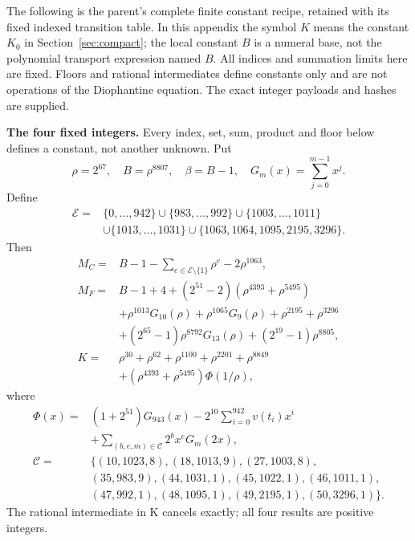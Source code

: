 The following is the parent's complete finite constant recipe, retained
with its fixed indexed transition table. In this appendix the symbol $K$
means the constant $K_0$ in Section~\ref{sec:compact}; the local constant
$B$ is a numeral base, not the polynomial transport expression named $B$.
All indices and summation limits here are fixed. Floors and rational
intermediates define constants only and are not operations of the
Diophantine equation. The exact integer payloads and hashes are supplied.

\providecommand{\fl}[1]{\left\lfloor#1\right\rfloor}
\providecommand{\rg}[2]{\{#1,\ldots,#2\}}
\textbf{The four fixed integers.}
Every index, set, sum, product and floor below defines a constant, not
another unknown. Put
\[
\rho=2^{67},\quad B=\rho^{8807},\quad\beta=B-1,\quad
G_m(x)=\sum_{j=0}^{m-1}x^j.
\]
Define
\[
\begin{split}
\mathcal E={}&\rg0{942}\cup\rg{983}{992}\cup\rg{1003}{1011}\\
&\cup\rg{1013}{1031}\cup\{1063,1064,1095,2195,3296\}.
\end{split}
\]
Then
\begin{align*}
M_C={}&B-1-\sum_{e\in\mathcal E\setminus\{1\}}\rho^e-2\rho^{1063},\\
M_F={}&B-1+4+(2^{51}-2)(\rho^{4393}+\rho^{5495})\\
&+\rho^{1013}G_{10}(\rho)+\rho^{1065}G_9(\rho)
  +\rho^{2195}+\rho^{3296}\\
&+(2^{65}-1)\rho^{8792}G_{13}(\rho)+(2^{19}-1)\rho^{8805},\\
K={}&\rho^{30}+\rho^{62}+\rho^{1100}+\rho^{2201}+\rho^{8849}\\
&+(\rho^{4393}+\rho^{5495})\Phi(1/\rho),
\end{align*}
where
\[
\begin{split}
\Phi(x)={}&(1+2^{51})G_{943}(x)
 -2^{10}\sum_{i=0}^{942}v(t_i)x^i\\
&+\sum_{(b,e,m)\in\mathcal C}2^b x^e G_m(2x),\\
\mathcal C={}&\{(10,1023,8),(18,1013,9),(27,1003,8),\\
&(35,983,9),(44,1031,1),(45,1022,1),(46,1011,1),\\
&(47,992,1),(48,1095,1),(49,2195,1),(50,3296,1)\}.
\end{split}
\]
The rational intermediate in K cancels exactly; all four results are positive integers.

